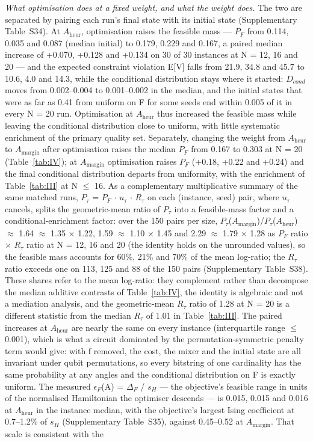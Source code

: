 \documentclass{ieeeaccess}
\begin{document}
\textit{What optimisation does at a fixed weight, and what the weight does.} The two are separated by pairing each run's final state with its initial state (Supplementary Table~S34). At $A_{\mathrm{heur}}$, optimisation raises the feasible mass --- $P_{F}$ from 0.114, 0.035 and 0.087 (median initial) to 0.179, 0.229 and 0.167, a paired median increase of +0.070, +0.128 and +0.134 on 30 of 30 instances at N = 12, 16 and 20 --- and the expected constraint violation E[V] falls from 21.9, 34.8 and 45.7 to 10.6, 4.0 and 14.3, while the conditional distribution stays where it started: $D_{cond}$ moves from 0.002--0.004 to 0.001--0.002 in the median, and the initial states that were as far as 0.41 from uniform on F for some seeds end within 0.005 of it in every N = 20 run. Optimisation at $A_{\mathrm{heur}}$ thus increased the feasible mass while leaving the conditional distribution close to uniform, with little systematic enrichment of the primary quality set. Separately, changing the weight from $A_{\mathrm{heur}}$ to $A_{\mathrm{margin}}$ after optimisation raises the median $P_{F}$ from 0.167 to 0.303 at N = 20 (Table~\ref{tab:IV}); at $A_{\mathrm{margin}}$ optimisation raises $P_{F}$ (+0.18, +0.22 and +0.24) and the final conditional distribution departs from uniformity, with the enrichment of Table~\ref{tab:III} at N $\leq$ 16. As a complementary multiplicative summary of the same matched runs, $P_{\tau}$ = $P_{F}$ $\cdot$ $u_{\tau}$ $\cdot$ $R_{\tau}$ on each (instance, seed) pair, where $u_{\tau}$ cancels, splits the geometric-mean ratio of $P_{\tau}$ into a feasible-mass factor and a conditional-enrichment factor: over the 150 pairs per size, $P_{\tau}$($A_{\mathrm{margin}}$)/$P_{\tau}$($A_{\mathrm{heur}}$) $\approx$ 1.64 $\approx$ 1.35 $\times$ 1.22, 1.59 $\approx$ 1.10 $\times$ 1.45 and 2.29 $\approx$ 1.79 $\times$ 1.28 as $P_{F}$ ratio $\times$ $R_{\tau}$ ratio at N = 12, 16 and 20 (the identity holds on the unrounded values), so the feasible mass accounts for 60\%, 21\% and 70\% of the mean log-ratio; the $R_{\tau}$ ratio exceeds one on 113, 125 and 88 of the 150 pairs (Supplementary Table~S38). These shares refer to the mean log-ratio: they complement rather than decompose the median additive contrasts of Table~\ref{tab:IV}, the identity is algebraic and not a mediation analysis, and the geometric-mean $R_{\tau}$ ratio of 1.28 at N = 20 is a different statistic from the median $R_{\tau}$ of 1.01 in Table~\ref{tab:III}. The paired increases at $A_{\mathrm{heur}}$ are nearly the same on every instance (interquartile range $\leq$ 0.001), which is what a circuit dominated by the permutation-symmetric penalty term would give: with f removed, the cost, the mixer and the initial state are all invariant under qubit permutations, so every bitstring of one cardinality has the same probability at any angles and the conditional distribution on F is exactly uniform. The measured $\epsilon_{F}$(A) = $\Delta_{F}$ / $s_{H}$ --- the objective's feasible range in units of the normalised Hamiltonian the optimiser descends --- is 0.015, 0.015 and 0.016 at $A_{\mathrm{heur}}$ in the instance median, with the objective's largest Ising coefficient at 0.7--1.2\% of $s_{H}$ (Supplementary Table~S35), against 0.45--0.52 at $A_{\mathrm{margin}}$. That scale is consistent with the 
\end{document}
